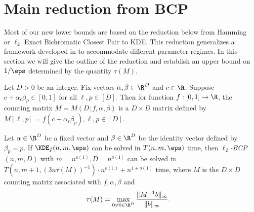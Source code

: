 \section{Main reduction from BCP}
\label{sec:mainreduction}
Most of our new lower bounds are based on the reduction below from Hamming or $\ell_2$ Exact Bichromatic Closest Pair to KDE. This reduction generalizes a framework developed in \cite{ACSS20} to accommodate different parameter regimes. In this section we will give the outline of the reduction and establish an upper bound on $1/\eps$ determined by the quantity $\tau(M)$.

\begin{definition}
\label{def:countingmatrix}
Let $D > 0$ be an integer. Fix vectors $\alpha, \beta \in \R^D$ and $c \in \R$. Suppose $c + \alpha_{\ell}\beta_{p} \in [0, 1]$ for all $\ell, p \in [D]$. Then for function $f: [0, 1] \rightarrow \R$, the counting matrix $M = M(D;f, \alpha, \beta)$ is a $D \times D$ matrix defined by $M[\ell, p] = f(c + \alpha_{\ell}\beta_p), \ell, p \in [D]$.
\end{definition}
\begin{theorem}
Let $\alpha \in \R^D$ be a fixed vector and $\beta \in \R^D$ be the identity vector defined by $\beta_p = p$. If $\KDE_f(n,m,\eps)$ can be solved in $T(n, m, \eps)$ time, then $\ell_2$\emph{\textsf{-BCP}}$(n, m, D)$ with $m = n^{o(1)}, D = n^{o(1)}$ can be solved in $T(n, m+1, (3n\tau(M))^{-1}) \cdot n^{o(1)} + n^{1 + o(1)}$ time, where $M$ is the $D \times D$ counting matrix associated with $f, \alpha, \beta$ and
\[\tau(M) = \max_{0 \ne b \in \R^{D}} \frac{\|M^{-1}b\|_{\infty}}{\|b\|_{\infty}}.\]
\end{theorem}

